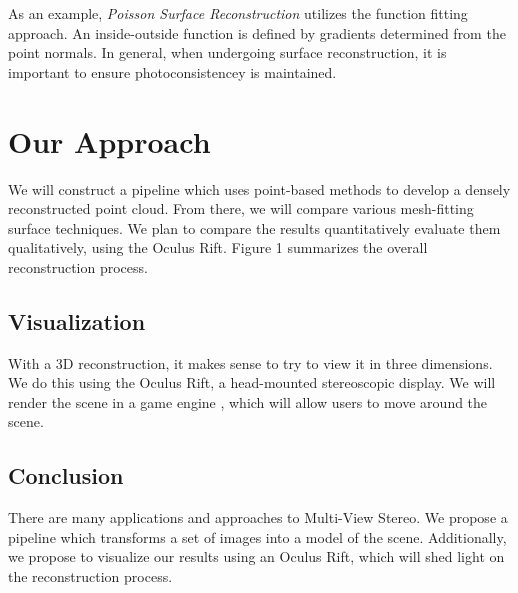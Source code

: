 \documentclass[10pt,twocolumn,letterpaper]{article}
\begin{document}
As an example, \textit{Poisson Surface Reconstruction} utilizes the function fitting approach.  An inside-outside function is defined by gradients determined from the point normals.\cite{poisson}  In general, when undergoing surface reconstruction, it is important to ensure photoconsistencey is maintained. 


\section{Our Approach}

We will construct a pipeline which uses point-based methods to develop a densely reconstructed point cloud. From there, we will compare various mesh-fitting surface techniques.  We plan to compare the results quantitatively evaluate them qualitatively, using the Oculus Rift.  Figure 1 summarizes the overall reconstruction process.

\subsection{Visualization}
With a 3D reconstruction, it makes sense to try to view it in three dimensions. We do this using the Oculus Rift, a head-mounted stereoscopic display. We will render the scene in a game engine \cite{unity}, which will allow users to move around the scene.

\subsection{Conclusion}
There are many applications and approaches to Multi-View Stereo. We propose a pipeline which transforms a set of images into a model of the scene.  Additionally, we propose to visualize our results using an Oculus Rift, which will shed light on the reconstruction process.



{\small
  
  
}
\end{document}
